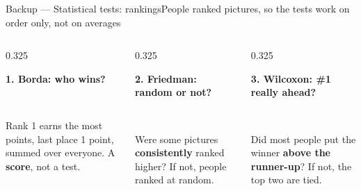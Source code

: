 \documentclass[aspectratio=169,10pt]{beamer}
\newcommand{\hl}[1]{{\color{knblue}\textbf{#1}}}
\newcommand{\panelheadsm}[1]{\noindent\colorbox{kncyan}{\parbox{0.96\textwidth}{\centering\vspace{1pt}\color{white}\tiny\bfseries #1\vspace{1pt}}}\\[0.2em]}
\begin{document}
\begin{frame}{Backup — Statistical tests: rankings}{People ranked pictures, so the tests work on order only, not on averages}
  \vspace{-0.2em}
  \begin{columns}[T,onlytextwidth]
    \begin{column}{0.325\textwidth}
      \panelheadsm{1. Borda: who wins?}
      \noindent\colorbox{knlight}{\parbox{0.96\textwidth}{\vspace{2pt}\scriptsize\raggedright
        Rank 1 earns the most points, last place 1 point, summed over everyone. A \hl{score}, not a test.\vspace{2pt}}}
    \end{column}
    \begin{column}{0.325\textwidth}
      \panelheadsm{2. Friedman: random or not?}
      \noindent\colorbox{knlight}{\parbox{0.96\textwidth}{\vspace{2pt}\scriptsize\raggedright
        Were some pictures \hl{consistently} ranked higher? If not, people ranked at random.\vspace{2pt}}}
    \end{column}
    \begin{column}{0.325\textwidth}
      \panelheadsm{3. Wilcoxon: \#1 really ahead?}
      \noindent\colorbox{knlight}{\parbox{0.96\textwidth}{\vspace{2pt}\scriptsize\raggedright
        Did most people put the winner \hl{above the runner-up}? If not, the top two are tied.\vspace{2pt}}}
    \end{column}
  \end{columns}
  \vspace{0.45em}


\end{frame}
\end{document}

